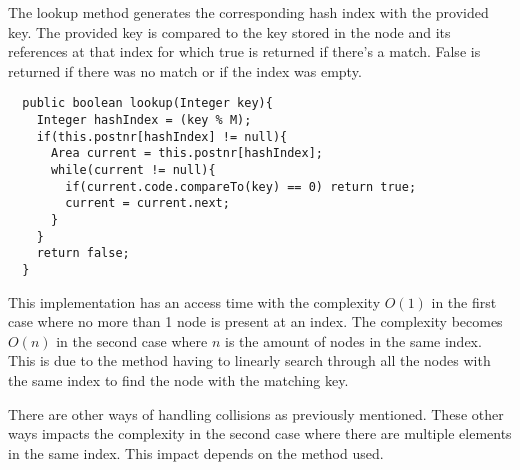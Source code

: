 \documentclass[a4paper,11pt]{article}
\begin{document}
The lookup method generates the corresponding hash index with the 
provided key. The provided key is compared to the key stored in the 
node and its references at that index for which true is returned if
there's a match. False is returned if there was no match or if the 
index was empty.

\begin{verbatim}
  public boolean lookup(Integer key){
    Integer hashIndex = (key % M);
    if(this.postnr[hashIndex] != null){
      Area current = this.postnr[hashIndex];
      while(current != null){
        if(current.code.compareTo(key) == 0) return true;
        current = current.next;
      }
    }
    return false;
  }
\end{verbatim}

This implementation has an access time with the complexity $ O(1)$
in the first case where no more than 1 node is present at an index. 
The complexity becomes $ O(n)$ in the second case where $ n$ is the 
amount of nodes in the same index. This is due to the method having 
to linearly search through all the nodes with the same index to find
the node with the matching key.

There are other ways of handling collisions as previously mentioned.
These other ways impacts the complexity in the second case where there
are multiple elements in the same index. This impact depends on the 
method used. 
\end{document}
